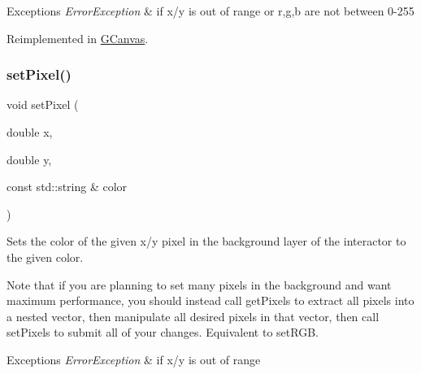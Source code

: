 \begin{DoxyExceptions}{Exceptions}
{\em Error\+Exception} & if x/y is out of range or r,g,b are not between 0-\/255 \\
\hline
\end{DoxyExceptions}


Reimplemented in \mbox{\hyperlink{classsgl_1_1GCanvas_a92c3e3ef930ae7742ad384af28aac241}{G\+Canvas}}.

\mbox{\label{classsgl_1_1GDrawingSurface_a09f9640e4ff7388dcfc391efd88d2415}} 
\subsubsection{\texorpdfstring{set\+Pixel()}{setPixel()}\hspace{0.1cm}{\footnotesize\ttfamily [3/3]}}
{\footnotesize\ttfamily void set\+Pixel (\begin{DoxyParamCaption}\item[{double}]{x,  }\item[{double}]{y,  }\item[{const std\+::string \&}]{color }\end{DoxyParamCaption})\hspace{0.3cm}{\ttfamily [virtual]}}



Sets the color of the given x/y pixel in the background layer of the interactor to the given color. 

Note that if you are planning to set many pixels in the background and want maximum performance, you should instead call get\+Pixels to extract all pixels into a nested vector, then manipulate all desired pixels in that vector, then call set\+Pixels to submit all of your changes. Equivalent to set\+R\+GB.


\begin{DoxyExceptions}{Exceptions}
{\em Error\+Exception} & if x/y is out of range \\
\hline
\end{DoxyExceptions}
\mbox{\label{classsgl_1_1GDrawingSurface_ab2f7c5a9462f552ad3f30d23c04605dd}} 
